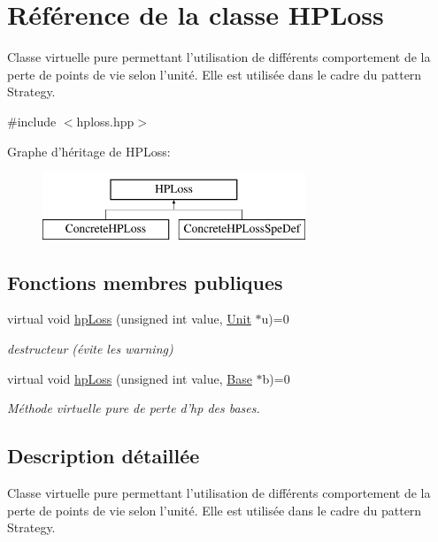 \hypertarget{classHPLoss}{\section{Référence de la classe H\+P\+Loss}
\label{classHPLoss}
}


Classe virtuelle pure permettant l'utilisation de différents comportement de la perte de points de vie selon l'unité. Elle est utilisée dans le cadre du pattern Strategy.  




{\ttfamily \#include $<$hploss.\+hpp$>$}

Graphe d'héritage de H\+P\+Loss\+:\begin{figure}[H]
\begin{center}
\leavevmode
\includegraphics[height=2.000000cm]{classHPLoss}
\end{center}
\end{figure}
\subsection*{Fonctions membres publiques}
\begin{DoxyCompactItemize}
\item 
virtual void \hyperlink{classHPLoss_a9572e4b06e306798325e2b27d15244e2}{hp\+Loss} (unsigned int value, \hyperlink{classUnit}{Unit} $\ast$u)=0
\begin{DoxyCompactList}\small\item\em destructeur (évite les warning) \end{DoxyCompactList}\item 
virtual void \hyperlink{classHPLoss_a65218bfa1695b56033b5ba894ba0d778}{hp\+Loss} (unsigned int value, \hyperlink{classBase}{Base} $\ast$b)=0
\begin{DoxyCompactList}\small\item\em Méthode virtuelle pure de perte d'hp des bases. \end{DoxyCompactList}\end{DoxyCompactItemize}


\subsection{Description détaillée}
Classe virtuelle pure permettant l'utilisation de différents comportement de la perte de points de vie selon l'unité. Elle est utilisée dans le cadre du pattern Strategy. 

